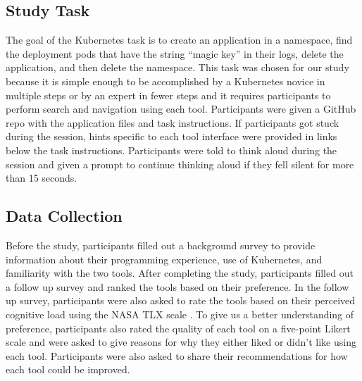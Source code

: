 \documentclass[11pt, oneside]{article}   	%
\begin{document}
\subsection{Study Task}
The goal of the Kubernetes task is to create an application in a namespace, find the deployment pods that have the string “magic key” in their logs, delete the application, and then delete the namespace. This task was chosen for our study because it is simple enough to be accomplished by a Kubernetes novice in multiple steps or by an expert in fewer steps and it requires participants to perform search and navigation using each tool. Participants were given a GitHub repo with the application files and task instructions. If participants got stuck during the session, hints specific to each tool interface were provided in links below the task instructions. Participants were told to think aloud during the session and given a prompt to continue thinking aloud if they fell silent for more than 15 seconds. 

\subsection{Data Collection}
Before the study, participants filled out a background survey to provide information about their programming experience, use of Kubernetes, and familiarity with the two tools. After completing the study, participants filled out a follow up survey and ranked the tools based on their preference. In the follow up survey, participants were also asked to rate the tools based on their perceived cognitive load using the NASA TLX scale \cite{}. To give us a better understanding of preference, participants also rated the quality of each tool on a five-point Likert scale and were asked to give reasons for why they either liked or didn’t like using each tool. Participants were also asked to share their recommendations for how each tool could be improved.
\end{document}

